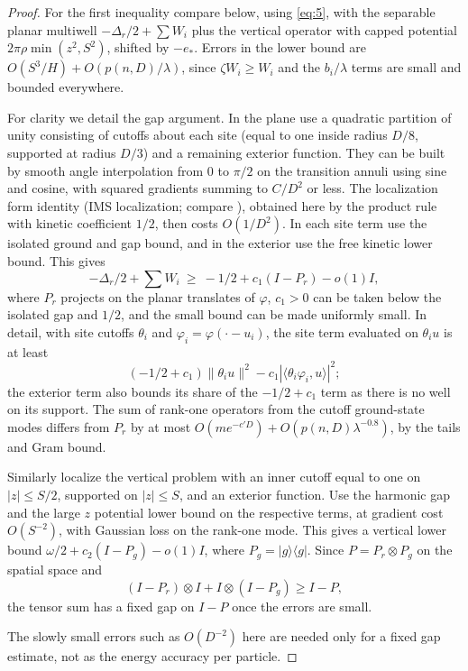 \begin{proof}
For the first inequality compare below, using \eqref{eq:5}, with the separable planar multiwell \(-\Delta_r/2+\sum W_i\) plus the vertical operator with capped potential \(2\pi\rho\min(z^2,S^2)\), shifted by \(-e_*\). Errors in the lower bound are \(O(S^3/H)+O(p(n,D)/\lambda)\), since \(\zeta W_i\ge W_i\) and the \(b_i/\lambda\) terms are small and bounded everywhere. 

For clarity we detail the gap argument. In the plane use a quadratic partition of unity consisting of cutoffs about each site (equal to one inside radius \(D/8\), supported at radius \(D/3\)) and a remaining exterior function. They can be built by smooth angle interpolation from 0 to \(\pi/2\) on the transition annuli using sine and cosine, with squared gradients summing to \(C/D^2\) or less. The localization form identity (IMS localization; compare
\cite[Lemma 3.1]{Simon1983}), obtained here by the product rule with
kinetic coefficient $1/2$, then costs \(O(1/D^2)\). In each site term use the isolated ground and gap bound, and in the exterior use the free kinetic lower bound. This gives
\[
 -\Delta_r/2+\sum W_i \ \ge\
 -1/2+c_1(I-P_r)-o(1)I,
\]
where \(P_r\) projects on the planar translates of \(\varphi\), \(c_1>0\) can be taken below the isolated gap and \(1/2\), and the small bound can be made uniformly small. In detail, with site cutoffs \(\theta_i\) and \(\varphi_i=\varphi(\cdot-u_i)\), the site term evaluated on \(\theta_i u\) is at least
\[
 (-1/2+c_1)\|\theta_i u\|^2-c_1|\langle\theta_i\varphi_i,u\rangle|^2;
\]
the exterior term also bounds its share of the \(-1/2+c_1\) term as there is no well on its support. The sum of rank-one operators from the cutoff ground-state modes differs from \(P_r\) by at most \(O(m e^{-c' D})+O(p(n,D)\lambda^{-0.8})\), by the tails and Gram bound. 

Similarly localize the vertical problem with an inner cutoff equal to one on \(|z|\le S/2\), supported on \(|z|\le S\), and an exterior function. Use the harmonic gap and the large \(z\) potential lower bound on the respective terms, at gradient cost \(O(S^{-2})\), with Gaussian loss on the rank-one mode. This gives a vertical lower bound \(\omega/2+c_2(I-P_g)-o(1)I\), where \(P_g=|g\rangle\langle g|\). Since \(P=P_r\otimes P_g\) on the spatial space and
\[
 (I-P_r)\otimes I+I\otimes(I-P_g)\ge I-P,
\]
the tensor sum has a fixed gap on \(I-P\) once the errors are small.

The slowly small errors such as \(O(D^{-2})\) here are needed only for a fixed gap estimate, not as the energy accuracy per particle.


\end{proof}

